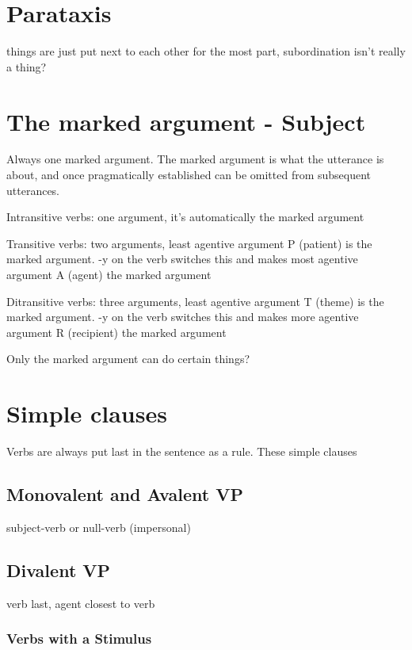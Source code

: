 \documentclass[smallroyalvopaper,9pt]{memoir} %
\begin{document}
\section{Parataxis}

things are just put next to each other for the most part, subordination isn't really a thing?

\section{The marked argument - Subject}

Always one marked argument. The marked argument is what the utterance is about, and once pragmatically established can be omitted from subsequent utterances. 

Intransitive verbs: one argument, it's automatically the marked argument

Transitive verbs: two arguments, least agentive argument P (patient) is the marked argument. -y on the verb switches this and makes most agentive argument A (agent) the marked argument

Ditransitive verbs: three arguments, least agentive argument T (theme) is the marked argument. -y on the verb switches this and makes more agentive argument R (recipient) the marked argument

Only the marked argument can do certain things?

\section{Simple clauses}

Verbs are always put last in the sentence as a rule. These simple clauses 

\subsection{Monovalent and Avalent VP}

subject-verb or null-verb (impersonal)

\subsection{Divalent VP}

verb last, agent closest to verb

\subsubsection{Verbs with a Stimulus}
\end{document}
